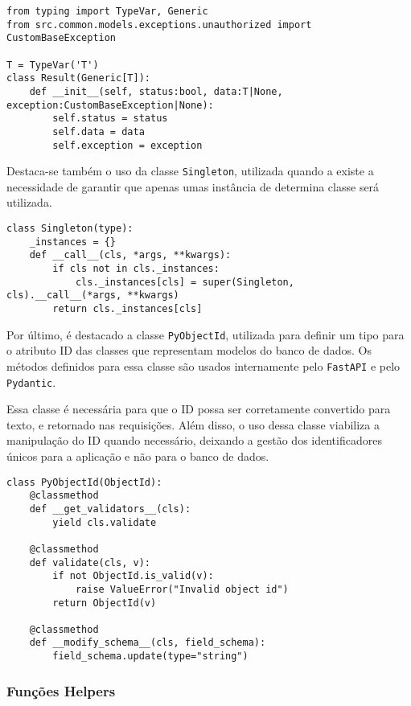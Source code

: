\begin{verbatim}
from typing import TypeVar, Generic
from src.common.models.exceptions.unauthorized import CustomBaseException

T = TypeVar('T')
class Result(Generic[T]):
    def __init__(self, status:bool, data:T|None, exception:CustomBaseException|None):
        self.status = status
        self.data = data
        self.exception = exception
\end{verbatim}

Destaca-se também o uso da classe \texttt{Singleton}, utilizada quando a existe a necessidade de garantir que apenas umas instância de determina classe será utilizada.

\begin{verbatim}
class Singleton(type):
    _instances = {}
    def __call__(cls, *args, **kwargs):
        if cls not in cls._instances:
            cls._instances[cls] = super(Singleton, cls).__call__(*args, **kwargs)
        return cls._instances[cls]
\end{verbatim}

Por último, é destacado a classe \texttt{PyObjectId}, utilizada para definir um tipo para o atributo ID das classes que representam modelos do banco de dados. Os métodos definidos para essa classe são usados internamente pelo \texttt{FastAPI} e pelo \texttt{Pydantic}.

Essa classe é necessária para que o ID possa ser corretamente convertido para texto, e retornado nas requisições. Além disso, o uso dessa classe viabiliza a manipulação do ID quando necessário, deixando a gestão dos identificadores únicos para a aplicação e não para o banco de dados.

\begin{verbatim}
class PyObjectId(ObjectId):
    @classmethod
    def __get_validators__(cls):
        yield cls.validate

    @classmethod
    def validate(cls, v):
        if not ObjectId.is_valid(v):
            raise ValueError("Invalid object id")
        return ObjectId(v)

    @classmethod
    def __modify_schema__(cls, field_schema):
        field_schema.update(type="string")
\end{verbatim}

\subsubsection{Funções Helpers}\label{subsubsec:helpers}


